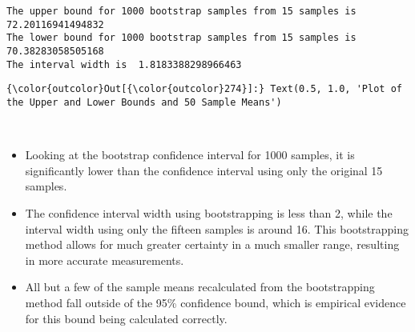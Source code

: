 \documentclass[11pt]{article}
\providecommand{\tightlist}{%
      \setlength{\itemsep}{0pt}\setlength{\parskip}{0pt}}
\begin{document}
    \begin{Verbatim}[commandchars=\\\{\}]
The upper bound for 1000 bootstrap samples from 15 samples is  72.20116941494832
The lower bound for 1000 bootstrap samples from 15 samples is  70.38283058505168
The interval width is  1.8183388298966463

    \end{Verbatim}

\begin{Verbatim}[commandchars=\\\{\}]
{\color{outcolor}Out[{\color{outcolor}274}]:} Text(0.5, 1.0, 'Plot of the Upper and Lower Bounds and 50 Sample Means')
\end{Verbatim}
            
    \begin{center}
    \end{center}
    { \hspace*{\fill} \\}
    
    \begin{itemize}
\tightlist
\item
  Looking at the bootstrap confidence interval for 1000 samples, it is
  significantly lower than the confidence interval using only the
  original 15 samples.
\item
  The confidence interval width using bootstrapping is less than 2,
  while the interval width using only the fifteen samples is around 16.
  This bootstrapping method allows for much greater certainty in a much
  smaller range, resulting in more accurate measurements.
\item
  All but a few of the sample means recalculated from the bootstrapping
  method fall outside of the 95\% confidence bound, which is empirical
  evidence for this bound being calculated correctly.
\end{itemize}
\end{document}
